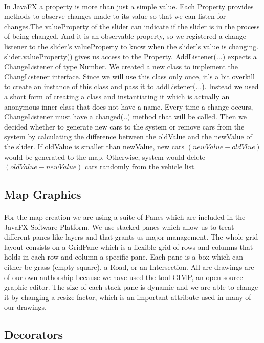 \documentclass[a4paper,11pt,titlepage]{article}
\begin{document}
\paragraph{}
In JavaFX a property is more than just a simple value. Each Property provides methods to observe changes made to its value so that we can listen for changes.The valueProperty of the slider can indicate if the slider is in the process of being changed. And it is an observable property, so we registered a change listener to the slider's valueProperty to know when the slider's value is changing. slider.valueProperty() gives us access to the Property. AddListener(...) expects a ChangeListener of type Number. We created a new class to implement the ChangListener interface. Since we will use this class only once, it's a bit overkill to create an instance of this class and pass it to addListener(...). Instead we used a short form of creating a class and instantiating it which is actually an anonymous inner class that does not have a name. Every time a change occurs, ChangeListener must have a changed(..) method that will be called. Then we decided whether to generate new cars to the system or remove cars from the system by calculating the difference between the oldValue and the newValue of the slider.
If oldValue is smaller than newValue, new cars $(newValue - oldVlue)$ would be generated to the map. Otherwise, system would delete $(oldValue - newValue)$ cars randomly from the vehicle list. 

\subsection{Map Graphics}
\paragraph{}
For the map creation we are using a suite of Panes which are included in the JavaFX Software Platform. We use stacked panes which allow us to treat different panes like layers and that grants us major management. The whole grid layout consists on a GridPane which is a flexible grid of rows and columns that holds in each row and column a specific pane. Each pane is a box which can either be grass (empty square), a Road, or an Intersection. All are drawings are of our own authorship because we have used the tool GIMP, an open source graphic editor. The size of each stack pane is dynamic and we are able to change it by changing a resize factor, which is an important attribute used in many of our drawings. 
\subsection{Decorators}
\end{document}
